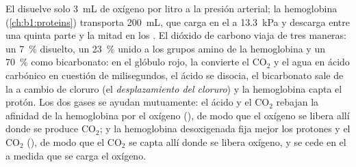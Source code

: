 \begin{proposition}\label{prop:b1:gas-exchange:transport}
El  disuelve solo \qty{3}{mL} de oxígeno por litro a la presión
arterial; la hemoglobina (\cref{ch:b1:proteins}) transporta \qty{200}{mL},
que carga en el  a \qty{13.3}{kPa} y descarga entre una quinta parte y
la mitad en los . El dióxido de carbono viaja de tres maneras: un
\qty{7}{\%} disuelto, un \qty{23}{\%} unido a los grupos amino de la
hemoglobina y un \qty{70}{\%} como bicarbonato: en el glóbulo rojo, la
\emph{} convierte el $\mathrm{CO_2}$ y el agua en ácido
carbónico en cuestión de milisegundos, el ácido se disocia, el bicarbonato
sale de la  a cambio de cloruro (el \emph{desplazamiento del cloruro})
y la hemoglobina capta el protón. Los dos gases se ayudan mutuamente: el
ácido y el $\mathrm{CO_2}$ rebajan la afinidad de la hemoglobina por el
oxígeno (\emph{}), de modo que el oxígeno se libera allí donde se
produce $\mathrm{CO_2}$; y la hemoglobina desoxigenada fija mejor los
protones y el $\mathrm{CO_2}$ (\emph{}), de modo que el
$\mathrm{CO_2}$ se capta allí donde se libera oxígeno, y se cede en el
 a medida que se carga el oxígeno.
\end{proposition}

